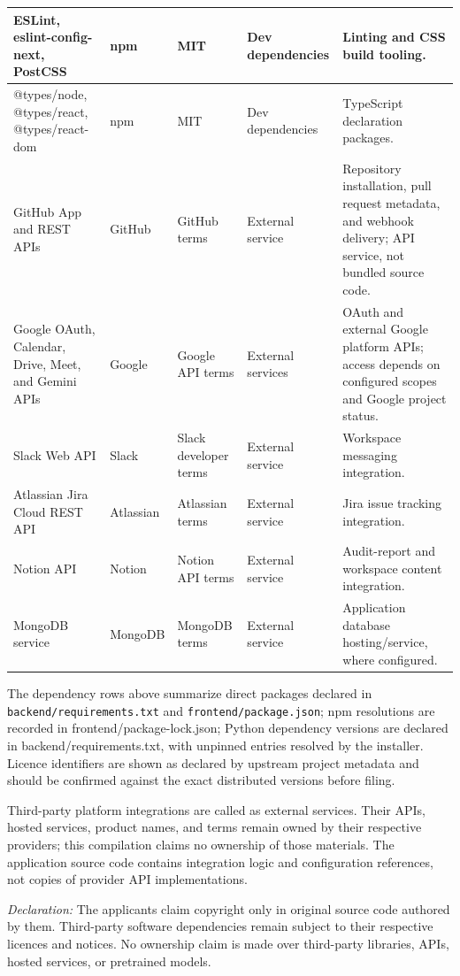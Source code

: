 \documentclass[11pt,a4paper]{article}
\begin{document}
{\begin{longtable}{@{}p{3.1cm}p{3.5cm}p{2.1cm}p{1.5cm}p{5.1cm}@{}}
\midrule
ESLint, eslint-config-next, PostCSS & npm & MIT & Dev dependencies & Linting and CSS build tooling. \\
\midrule
@types/node, @types/react, @types/react-dom & npm & MIT & Dev dependencies & TypeScript declaration packages. \\
\midrule
GitHub App and REST APIs & GitHub & GitHub terms & External service & Repository installation, pull request metadata, and webhook delivery; API service, not bundled source code. \\
\midrule
Google OAuth, Calendar, Drive, Meet, and Gemini APIs & Google & Google API terms & External services & OAuth and external Google platform APIs; access depends on configured scopes and Google project status. \\
\midrule
Slack Web API & Slack & Slack developer terms & External service & Workspace messaging integration. \\
\midrule
Atlassian Jira Cloud REST API & Atlassian & Atlassian terms & External service & Jira issue tracking integration. \\
\midrule
Notion API & Notion & Notion API terms & External service & Audit-report and workspace content integration. \\
\midrule
MongoDB service & MongoDB & MongoDB terms & External service & Application database hosting/service, where configured. \\
\bottomrule
\end{longtable}

\vspace{0.6em}
The dependency rows above summarize direct packages declared in \texttt{backend/requirements.txt} and \texttt{frontend/package.json}; npm resolutions are recorded in frontend/package-lock.json; Python dependency versions are declared in backend/requirements.txt, with unpinned entries resolved by the installer. Licence identifiers are shown as declared by upstream project metadata and should be confirmed against the exact distributed versions before filing.

Third-party platform integrations are called as external services. Their APIs, hosted services, product names, and terms remain owned by their respective providers; this compilation claims no ownership of those materials. The application source code contains integration logic and configuration references, not copies of provider API implementations.

\vspace{0.8em}
\noindent\textit{Declaration:} The applicants claim copyright only in original source code authored by them. Third-party software dependencies remain subject to their respective licences and notices. No ownership claim is made over third-party libraries, APIs, hosted services, or pretrained models.

}
\end{document}
